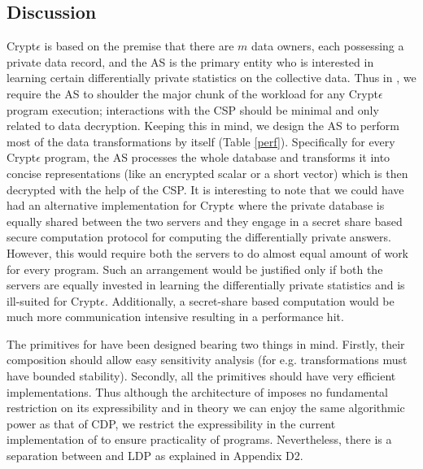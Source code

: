 \subsection{Discussion}\label{sec:discuss-arch}
 Crypt$\epsilon$  is based on the premise that there are $m$  data owners, each possessing a private data record, and the \textsf{AS} is the primary entity who is interested in learning certain differentially private statistics on the collective data.  Thus in \system, we require the \textsf{AS} to  shoulder the major chunk of the workload for any Crypt$\epsilon$ program execution; interactions with the \textsf{CSP} should be minimal and only related to data decryption.
Keeping this in  mind, we design the \textsf{AS} to perform most of the data transformations by itself (Table \ref{perf}). Specifically for every Crypt$\epsilon$ program, the \textsf{AS} processes the whole database and transforms it into concise representations (like an encrypted scalar or a short vector) which is then decrypted with the help of the \textsf{CSP}. It is interesting to note that we could have had an alternative implementation for Crypt$\epsilon$ where the private database is equally shared between the two servers and they engage in a secret share based secure computation protocol for computing the differentially private answers. However, this would require both the servers to do almost equal amount of work for every program. Such an arrangement would be justified only if both the servers are equally invested in learning the differentially private statistics and is ill-suited for Crypt$\epsilon$. Additionally, a secret-share based computation would be much more communication intensive resulting in a performance hit. 

The primitives for \system have been designed bearing two things in mind. Firstly, their composition should allow easy sensitivity analysis (for e.g. transformations must have bounded stability). Secondly, all the primitives should have very efficient implementations. Thus although the architecture of \system imposes no fundamental restriction on its expressibility and in theory we can enjoy the same algorithmic power as that of \textsf{CDP}, we restrict the expressibility in the current implementation of \system to ensure practicality of \system programs. Nevertheless, there is a separation between \system and \textsf{LDP} as explained in Appendix D2.


